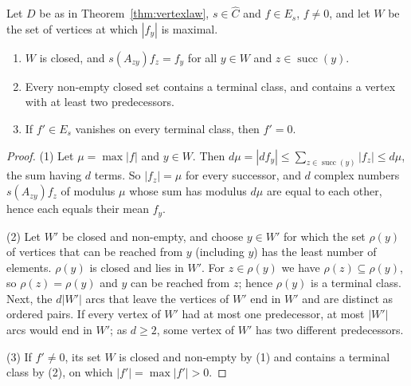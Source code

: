 \begin{lemma}\label{lem:maxp}
Let $D$ be as in Theorem~\ref{thm:vertexlaw}, $s\in\hat C$ and $f\in E_s$, $f\ne0$, and let $W$ be the set of vertices at which $|f_y|$ is maximal.
\begin{enumerate}
\item[(1)] $W$ is closed, and $s(A_{zy})f_z=f_y$ for all $y\in W$ and $z\in\operatorname{succ}(y)$.
\item[(2)] Every non-empty closed set contains a terminal class, and contains a vertex with at least two predecessors.
\item[(3)] If $f'\in E_s$ vanishes on every terminal class, then $f'=0$.
\end{enumerate}
\end{lemma}
\begin{proof}
(1) Let $\mu=\max|f|$ and $y\in W$. Then $d\mu=|d f_y|\le\sum_{z\in\operatorname{succ}(y)}|f_z|\le d\mu$, the sum having $d$ terms. So $|f_z|=\mu$ for every successor, and $d$ complex numbers $s(A_{zy})f_z$ of modulus $\mu$ whose sum has modulus $d\mu$ are equal to each other, hence each equals their mean $f_y$.

(2) Let $W'$ be closed and non-empty, and choose $y\in W'$ for which the set $\rho(y)$ of vertices that can be reached from $y$ (including $y$) has the least number of elements. $\rho(y)$ is closed and lies in $W'$. For $z\in\rho(y)$ we have $\rho(z)\subseteq\rho(y)$, so $\rho(z)=\rho(y)$ and $y$ can be reached from $z$; hence $\rho(y)$ is a terminal class. Next, the $d|W'|$ arcs that leave the vertices of $W'$ end in $W'$ and are distinct as ordered pairs. If every vertex of $W'$ had at most one predecessor, at most $|W'|$ arcs would end in $W'$; as $d\ge2$, some vertex of $W'$ has two different predecessors.

(3) If $f'\ne0$, its set $W$ is closed and non-empty by (1) and contains a terminal class by (2), on which $|f'|=\max|f'|>0$.
\end{proof}

